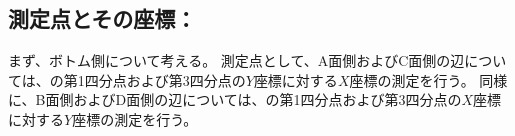 \subsection{測定点とその座標：\BottomEndFaceOutChamfer}
まず、ボトム側について考える。
測定点として、A面側およびC面側の辺については、\BDOD の第1四分点および第3四分点の$Y$座標に対する$X$座標の測定を行う。
同様に、B面側およびD面側の辺については、\ACOD の第1四分点および第3四分点の$X$座標に対する$Y$座標の測定を行う。


